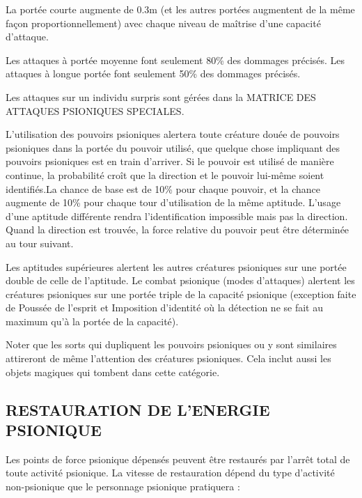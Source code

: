 \documentclass[11pt]{article}
\begin{document}
{\bigskip

La portée courte augmente de 0.3m (et les autres portées augmentent de la même façon proportionnellement) avec chaque niveau de maîtrise d'une capacité d'attaque.

\bigskip

Les attaques à portée moyenne font seulement 80\% des dommages précisés. Les attaques à longue portée font seulement 50\% des dommages précisés.

\bigskip

Les attaques sur un individu surpris sont gérées dans la MATRICE DES ATTAQUES PSIONIQUES SPECIALES.

\bigskip

L'utilisation des pouvoirs psioniques alertera toute créature douée de pouvoirs psioniques dans la portée du pouvoir utilisé, que quelque chose impliquant des pouvoirs psioniques est en train d'arriver. Si le pouvoir est utilisé de manière continue, la probabilité croît que la direction et le pouvoir lui-même soient identifiés.La chance de base est de 10\% pour chaque pouvoir, et la chance augmente de 10\% pour chaque tour d'utilisation de la même aptitude. L'usage d'une aptitude différente rendra l'identification impossible mais pas la direction. Quand la direction est trouvée, la force relative du pouvoir peut être déterminée au tour suivant.

\bigskip

Les aptitudes supérieures alertent les autres créatures psioniques sur une portée double de celle de l'aptitude. Le combat psionique (modes d'attaques) alertent les créatures psioniques sur une portée triple de la capacité psionique (exception faite de Poussée de l'esprit et Imposition d'identité où la détection ne se fait au maximum qu'à la portée de la capacité).

\bigskip

Noter que les sorts qui dupliquent les pouvoirs psioniques ou y sont similaires attireront de même l'attention des créatures psioniques. Cela inclut aussi les objets magiques qui tombent dans cette catégorie.

\subsection*{\normalsize RESTAURATION DE L'ENERGIE PSIONIQUE}

Les points de force psionique dépensés peuvent être restaurés par l'arrêt total de toute activité psionique. La vitesse de restauration dépend du type d'activité non-psionique que le personnage psionique pratiquera :

}
\end{document}

